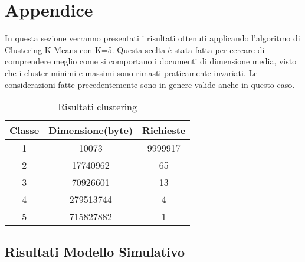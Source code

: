 \chapter{Appendice}\label{appendice}
In questa sezione verranno presentati i risultati ottenuti applicando l'algoritmo di Clustering K-Means con K=5. Questa scelta è stata fatta per cercare di comprendere meglio come si comportano i documenti di dimensione media, visto che i cluster minimi e massimi sono rimasti praticamente invariati. Le considerazioni fatte precedentemente sono in genere valide anche in questo caso. 
\begin{table}[H]
\begin{center}
\begin{tabular}{||c|c|c||}
\hline
Classe	&Dimensione(byte)		&Richieste \\ 
\hline\hline
1 &10073 &9999917\\ \hline 
2 &17740962 &65 \\ \hline 
3 &70926601 &13 \\ \hline 
4 &279513744 &4 \\ \hline 
5 &715827882 &1 \\ \hline
\end{tabular}
\end{center}
\caption{Risultati clustering}
\label{risclustering}
\end{table}
\section{Risultati Modello Simulativo}
